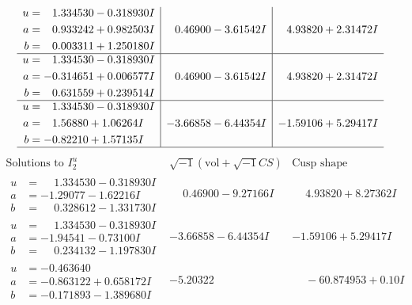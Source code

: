\documentclass[1p]{elsarticle_modified}
\theoremstyle{definition}
\newcommand{\I}{\sqrt{-1}}
\begin{document}
$$\begin{array}{c|c|c}
\begin{aligned}
u &= \phantom{-}1.334530 - 0.318930 I \\
a &= \phantom{-}0.933242 + 0.982503 I \\
b &= \phantom{-}0.003311 + 1.250180 I\end{aligned}
 & \phantom{-}0.46900 - 3.61542 I & \phantom{-}4.93820 + 2.31472 I \\ \hline\begin{aligned}
u &= \phantom{-}1.334530 - 0.318930 I \\
a &= -0.314651 + 0.006577 I \\
b &= \phantom{-}0.631559 + 0.239514 I\end{aligned}
 & \phantom{-}0.46900 - 3.61542 I & \phantom{-}4.93820 + 2.31472 I \\ \hline\begin{aligned}
u &= \phantom{-}1.334530 - 0.318930 I \\
a &= \phantom{-}1.56880 + 1.06264 I \\
b &= -0.82210 + 1.57135 I\end{aligned}
 & -3.66858 - 6.44354 I & -1.59106 + 5.29417 I\\
 \hline 
 \end{array}$$\newpage$$\begin{array}{c|c|c}  
\text{Solutions to }I^u_{2}& \I (\text{vol} + \sqrt{-1}CS) & \text{Cusp shape}\\
 \hline 
\begin{aligned}
u &= \phantom{-}1.334530 - 0.318930 I \\
a &= -1.29077 - 1.62216 I \\
b &= \phantom{-}0.328612 - 1.331730 I\end{aligned}
 & \phantom{-}0.46900 - 9.27166 I & \phantom{-}4.93820 + 8.27362 I \\ \hline\begin{aligned}
u &= \phantom{-}1.334530 - 0.318930 I \\
a &= -1.94541 - 0.73100 I \\
b &= \phantom{-}0.234132 - 1.197830 I\end{aligned}
 & -3.66858 - 6.44354 I & -1.59106 + 5.29417 I \\ \hline\begin{aligned}
u &= -0.463640\phantom{ +0.000000I} \\
a &= -0.863122 + 0.658172 I \\
b &= -0.171893 - 1.389680 I\end{aligned}
 & -5.20322\phantom{ +0.000000I} & \phantom{-}                -6
0.874953 + 0. 10   I\phantom{ +0.000000I} \\ \hline\begin{aligned}

\end{aligned}
\end{array}$$
\end{document}
